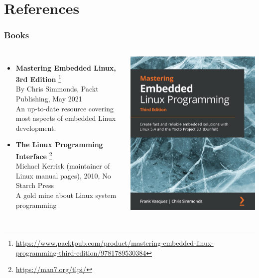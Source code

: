 \section{References}

\begin{frame}
  \frametitle{Books}
  \begin{columns}
    \small
    \begin{itemize}
    \item {\bf Mastering Embedded Linux, 3rd Edition}
      \footnote{\tiny
\url{https://www.packtpub.com/product/mastering-embedded-linux-programming-third-edition/9781789530384}}\\
      By Chris Simmonds, Packt Publishing, May 2021\\
      An up-to-date resource covering most aspects of embedded Linux
      development.
    \item {\bf The Linux Programming Interface}
      \footnote{\tiny \url{https://man7.org/tlpi/}}\\
      Michael Kerrisk (maintainer of Linux manual pages), 2010, No Starch Press\\
      A gold mine about Linux system programming\\
    \end{itemize}
    \normalsize
    \includegraphics[height=0.25\textheight]{slides/sysdev-references/book-mastering-embedded-linux3.jpg}\\

\end{columns}
\end{frame}
